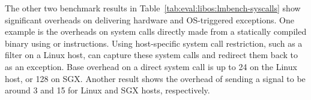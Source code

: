 The other two benchmark results in Table~\ref{tab:eval:libos:lmbench-syscalls}
show significant overheads
on delivering hardware and OS-triggered exceptions.
One example
is the overheads on system calls directly made from a statically compiled binary
using  or  instructions.
Using host-specific system call restriction,
such as a \seccomp{} filter
on a Linux host,
\graphene{} can capture these system calls %
and redirect them back to \thelibos{} as an exception. %
Base overhead on a direct system call
is up to 24\x{} on the Linux host, or 128\x{} on SGX.
Another result shows the overhead of
sending a  signal
to be around 3\x{} and 15\x{} for Linux and SGX hosts, respectively.
















